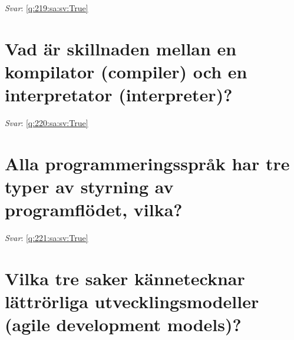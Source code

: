 \documentclass[a4paper,11pt,oneside]{book}
\begin{document}
\begin{sloppypar}
\label{q:219:sa:sv:False}

\vspace{2cm}

\noindent\makebox[\textwidth]{\hrulefill}

\vspace{1cm}

\textit{Svar}: \autoref{q:219:sa:sv:True}



\section{Vad \"ar skillnaden mellan en kompilator (compiler) och en interpretator (interpreter)?}

\label{q:220:sa:sv:False}

\vspace{2cm}

\noindent\makebox[\textwidth]{\hrulefill}

\vspace{1cm}

\textit{Svar}: \autoref{q:220:sa:sv:True}



\section{Alla programmeringsspr\r{a}k har tre typer av styrning av programfl\"odet, vilka?}

\label{q:221:sa:sv:False}

\vspace{2cm}

\noindent\makebox[\textwidth]{\hrulefill}

\vspace{1cm}

\textit{Svar}: \autoref{q:221:sa:sv:True}



\section{Vilka tre saker k\"annetecknar l\"attr\"orliga utvecklingsmodeller (agile development models)?}

\label{q:222:sa:sv:False}

\vspace{2cm}

\noindent\makebox[\textwidth]{\hrulefill}

\vspace{1cm}


\end{sloppypar}
\end{document}
